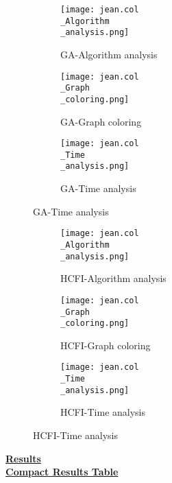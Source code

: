 \documentclass[10pt]{article}
\begin{document}
\graphicspath{{./Core1/Solutions/GA/jean.col}}
\begin{figure}[H]
\begin{subfigure}{.33\textwidth}
  \centering
  \texttt{[image: jean.col\\\_Algorithm\\\_analysis.png]}
  \caption{GA-Algorithm analysis}
   \label{fig:subfig1}
\end{subfigure}%
\begin{subfigure}{.33\textwidth}
  \centering
  \texttt{[image: jean.col\\\_Graph\\\_coloring.png]}
  \caption{GA-Graph coloring}
  \label{fig:subfig2}
\end{subfigure}
\begin{subfigure}{.33\textwidth}
  \centering
  \texttt{[image: jean.col\\\_Time\\\_analysis.png]}
  \caption{GA-Time analysis}
  \end{subfigure}
\end{figure}

\graphicspath{{./Core1/Solutions/HCFI/jean.col}}
\begin{figure}[H]
\begin{subfigure}{.33\textwidth}
  \centering
  \texttt{[image: jean.col\\\_Algorithm\\\_analysis.png]}
  \caption{HCFI-Algorithm analysis}
   \label{fig:subfig1}
\end{subfigure}%
\begin{subfigure}{.33\textwidth}
  \centering
  \texttt{[image: jean.col\\\_Graph\\\_coloring.png]}
  \caption{HCFI-Graph coloring}
  \label{fig:subfig2}
\end{subfigure}
\begin{subfigure}{.33\textwidth}
  \centering
  \texttt{[image: jean.col\\\_Time\\\_analysis.png]}
  \caption{HCFI-Time analysis}
  \end{subfigure}
\end{figure}
\vspace{2cm}
\begin{center}
\hyperlink{page.8}{\textbf{Results}}\\
\vspace{0.5cm}
\hyperlink{page.71}{\textbf{Compact Results Table}}
\end{center}
\pagebreak
\end{document}
